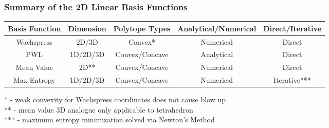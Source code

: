 \documentclass[compress,10pt]{beamer}
\begin{document}
\begin{frame}[t]\frametitle{Summary of the 2D Linear Basis Functions}
\centering
\vspace{1cm}
\begin{table}
\footnotesize
\begin{tabular}{|c|c|c|c|c|}
\hline
Basis Function & Dimension & Polytope Types & Analytical/Numerical & Direct/Iterative \\
\hline \hline
Wachspress	&2D/3D&	Convex*&	Numerical	&Direct\\ \hline
PWL&	1D/2D/3D&	Convex/Concave&	Analytical	&Direct\\ \hline
Mean Value&	2D**&	Convex/Concave&	Numerical	&Direct\\ \hline
Max Entropy&	1D/2D/3D	&Convex/Concave&	Numerical&	Iterative***\\ \hline
\end{tabular}
\end{table}
\vspace{0.5cm}
\begin{block}{}
* - weak convexity for Wachspress coordinates does not cause blow up\\
** - mean value 3D analogue only applicable to tetrahedron \\
*** - maximum entropy minimization solved via Newton's Method 
\end{block}
\end{frame}
\end{document}
